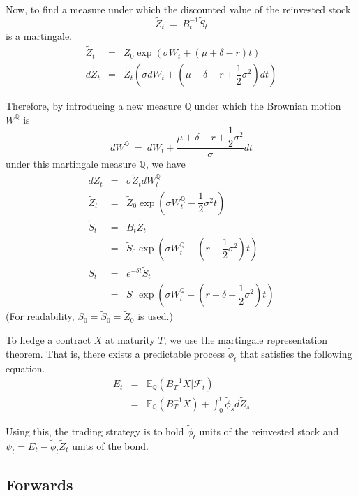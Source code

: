 \documentclass[uplatex,a4j,12pt,dvipdfmx]{jsarticle}
\begin{document}
${}$

Now, to find a measure under which the discounted value of the reinvested stock
$$
	\tilde{Z}_{t}
	\ = \
	B^{-1}_{t}
	\tilde{S}_{t}
$$
is a martingale.
%
%
\begin{eqnarray*}
	\tilde{Z}_{t}
	&=&
	Z_{0} \exp (\sigma W_{t} + ( \mu + \delta -r ) t )
	\\
	d \tilde{Z}_{t}
	&=&
	\tilde{Z}_{t}
	\left( \sigma dW_{t} + \left( \mu + \delta -r + \dfrac{1}{2} \sigma^{2} \right) dt \right)
\end{eqnarray*}
%
%

Therefore, by introducing a new measure $\mathbb{Q}$ under which the Brownian motion $W^{\mathbb{Q}}$ is
$$
	d W^{\mathbb{Q}}
	\ = \
	d W_{t} + \dfrac{\mu + \delta -r + \dfrac{1}{2} \sigma^{2}}{\sigma} dt
$$
under this martingale measure $\mathbb{Q}$, we have
%
%
\begin{eqnarray*}
	d \tilde{Z}_{t}
	&=&
	\sigma \tilde{Z}_{t} d W^{\mathbb{Q}}_{t}
	\\
	\tilde{Z}_{t}
	&=&
	\tilde{Z}_{0}
	\exp
	\left(
	\sigma W^{\mathbb{Q}}_{t}
	- \dfrac{1}{2} \sigma^{2} t
	\right)
	\\
	\tilde{S}_{t}
	&=&
	B_{t} \tilde{Z}_{t}
	\\ &=&
	\tilde{S}_{0}
	\exp
	\left(
	\sigma W^{\mathbb{Q}}_{t}
	+
	\left(
	r
	-
	\dfrac{1}{2} \sigma^{2}
	\right)
	t
	\right)
	\\
	S_{t}
	&=&
	e^{-\delta t} \tilde{S}_{t}
	\\ &=&
	S_{0}
	\exp
	\left(
	\sigma W^{\mathbb{Q}}_{t}
	+
	\left(
	r
	- \delta
	- \dfrac{1}{2} \sigma^{2}
	\right)
	t
	\right)
\end{eqnarray*}
%
%
(For readability, $S_{0}=\tilde{S}_{0}=\tilde{Z}_{0}$ is used.)
${}$

To hedge a contract $X$ at maturity $T$, we use the martingale representation theorem. That is, there exists a predictable process $\tilde{\phi}_{t}$ that satisfies the following equation.
%
%
\begin{eqnarray*}
	E_{t}
	&=&
	\mathbb{E}_{\mathbb{Q}} ( B_{T}^{-1} X | \mathcal{F}_{t} )
	\\
	&=&
	\mathbb{E}_{\mathbb{Q}} ( B_{T}^{-1} X )
	+
	\int^{t}_{0} \tilde{\phi}_{s} d \tilde{Z}_{s}
\end{eqnarray*}
%
%

Using this, the trading strategy is to hold $\tilde{\phi}_{t}$ units of the reinvested stock and
$\psi_{t}=E_{t} - \tilde{\phi}_{t} \tilde{Z}_{t}$
units of the bond.
\subsection{Forwards}
\end{document}
